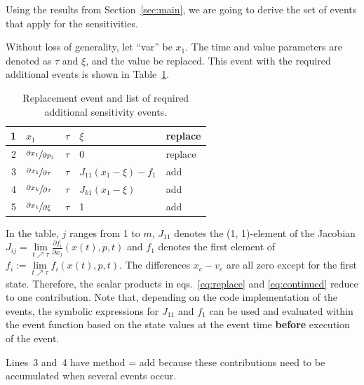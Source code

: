 \documentclass[journal, a4paper]{IEEEtran}
\begin{document}
Using the results from Section~\ref{sec:main}, we are going to derive the set of events that apply for the sensitivities.

Without loss of generality, let ``var'' be $x_1$. The time and value parameters are denoted as $\tau$ and $\xi$, and the value be replaced. This event with the required additional events is shown in Table~\ref{tab:replacement}.
\begin{table}[ht]
\caption{Replacement event and list of required additional sensitivity events.}
\label{tab:replacement}
\begin{center}
\begin{tabular}{|r|l|l|l|l|}\hline
     1 & $x_1$ & $\tau$ & $\xi$ & replace \\
     \hline
     2 & $\sfrac{\partial x_1}{\partial p_j}$ & $\tau$ & $0$ & replace \\
     3 & $\sfrac{\partial x_1}{\partial \tau}$ & $\tau$ & $J_{11}(x_1-\xi)-f_1$ & add \\
     4 & $\sfrac{\partial x_k}{\partial \tau}$ & $\tau$ & $J_{k1}(x_1-\xi)$ & add \\
     5 &$\sfrac{\partial x_1}{\partial \xi}$ & $\tau$ & 1 & add \\
     \hline
\end{tabular}
\end{center}
\end{table}
In the table, $j$ ranges from 1 to $m$, $J_{11}$ denotes the (1, 1)-element of the Jacobian $J_{ij} = \lim\limits_{t \nearrow \tau}\frac{\partial f_i}{\partial x_j}(x(t), p, t)$ and $f_1$ denotes the first element of $f_i := \lim\limits_{t \nearrow \tau}f_i(x(t), p, t)$.
The differences $x_e - v_e$ are all zero except for the first state. Therefore, the scalar products in eqs.~\eqref{eq:replace} and \eqref{eq:continued} reduce to one contribution.
Note that, depending on the code implementation of the events, the symbolic expressions for $J_{11}$ and $f_1$ can be used and evaluated within the event function based on the state values at the event time \textbf{before} execution of the event.

Lines~3 and~4 have method = add because these contributions need to be accumulated when several events occur.

\end{document}
